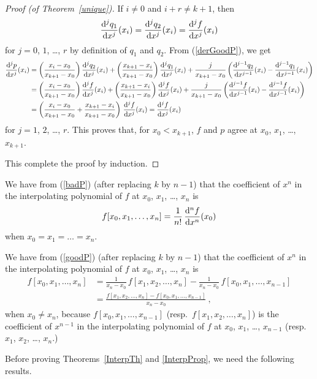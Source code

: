 \begin{proof}[Proof (of Theorem~\ref{unique})]
If $i\neq 0$ and $i+r \neq k+1$, then
\[
\frac{\mathrm{d}^{j}{q_1}}{\mathrm{d}{x}^{j}}(x_i) = \frac{\mathrm{d}^{j}{q_2}}{\mathrm{d}{x}^{j}}(x_i) = \frac{\mathrm{d}^{j}{f}}{\mathrm{d}{x}^{j}}(x_i)
\]
for $j=0$, $1$, \ldots, $r$ by definition of $q_1$ and $q_2$.
From (\ref{derGoodP}), we get
\begin{align*}
\frac{\mathrm{d}^{j}{p}}{\mathrm{d}{x}^{j}}(x_i)
&= \left( \frac{x_i-x_0}{x_{k+1}-x_0}\right)\frac{\mathrm{d}^{j}{q_2}}{\mathrm{d}{x}^{j}}(x_i) +
\left(\frac{x_{k+1}-x_i}{x_{k+1}-x_0}\right) \frac{\mathrm{d}^{j}{q_1}}{\mathrm{d}{x}^{j}}(x_i)
+ \frac{j}{x_{k+1}-x_0}\left(
\frac{\mathrm{d}^{j-1}{q_2}}{\mathrm{d}{x}^{j-1}}(x_i)-\frac{\mathrm{d}^{j-1}{q_1}}{\mathrm{d}{x}^{j-1}}(x_i)\right) \\
&= \left(\frac{x_i-x_0}{x_{k+1}-x_0}\right)\frac{\mathrm{d}^{j}{f}}{\mathrm{d}{x}^{j}}(x_i) +
\left(\frac{x_{k+1}-x_i}{x_{k+1}-x_0}\right) \frac{\mathrm{d}^{j}{f}}{\mathrm{d}{x}^{j}}(x_i)
+\frac{j}{x_{k+1}-x_0}\left(
\frac{\mathrm{d}^{j-1}{f}}{\mathrm{d}{x}^{j-1}}(x_i)-\frac{\mathrm{d}^{j-1}{f}}{\mathrm{d}{x}^{j-1}}(x_i)\right) \\
&= \left( \frac{x_i-x_0}{x_{k+1}-x_0} +
  \frac{x_{k+1}-x_i}{x_{k+1}-x_0} \right) \,\frac{\mathrm{d}^{j}{f}}{\mathrm{d}{x}^{j}}(x_i)
= \frac{\mathrm{d}^{j}{f}}{\mathrm{d}{x}^{j}}(x_i)
\end{align*}
for $j=1$, $2$, \ldots, $r$.
This proves that, for $x_0 < x_{k+1}$, $f$ and $p$ agree at
$x_0$, $x_1$, \ldots, $x_{k+1}$.

This complete the proof by induction.
\end{proof}

\begin{rmk}
We have from (\ref{badP}) (after replacing $k$ by $n-1$) that the
coefficient of $x^n$ in the interpolating polynomial of $f$ at $x_0$,
$x_1$, \ldots, $x_n$ is
\begin{equation}\label{coeffA}
f[x_0,x_1,\ldots,x_n] = \frac{1}{n!}\,\frac{\mathrm{d}^{n}{f}}{\mathrm{d}{x}^{n}}(x_0)
\end{equation}
when $x_0 = x_1 = \ldots = x_n$.

We have from (\ref{goodP}) (after replacing $k$ by $n-1$) that the
coefficient of $x^n$ in the interpolating polynomial of $f$ at $x_0$,
$x_1$, \ldots, $x_n$ is
\begin{align*}
f[x_0,x_1,\ldots,x_n] &= \frac{1}{x_n-x_0}\,f[x_1,x_2,\ldots,x_n] -
\frac{1}{x_n-x_0}\, f[x_0,x_1,\ldots,x_{n-1}] \\
&= \frac{f[x_1,x_2,\ldots,x_n]-f[x_0,x_1,\ldots,x_{n-1}]}{x_n-x_0} \ ,
\end{align*}
when $x_0 \neq x_n$, because $f[x_0,x_1,\ldots,x_{n-1}]$ (resp.\
$f[x_1,x_2,\ldots,x_n]$) is the coefficient of $x^{n-1}$ in the
interpolating polynomial of $f$ at
$x_0$, $x_1$, \ldots, $x_{n-1}$ (resp.\ $x_1$, $x_2$, \ldots, $x_n$.)
\label{rmkNDDF}
\end{rmk}

Before proving Theorems~\ref{InterpTh} and \ref{InterpProp}, we need
the following results.

